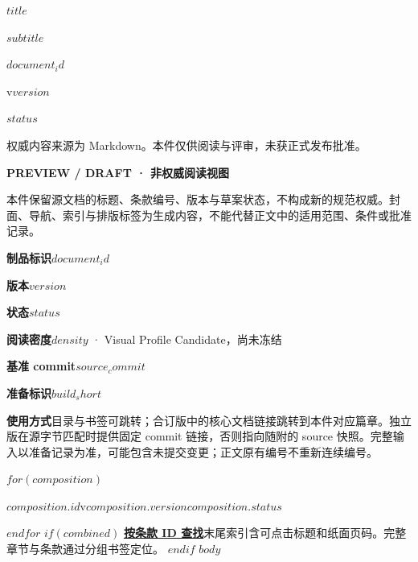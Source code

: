 \documentclass[UTF8,fontset=none,scheme=plain,11pt,a4paper,oneside,openany]{kbbook}
\begin{document}
\pagestyle{empty}
\pagecolor{PreviewNavy}\color{white}
\vspace*{30mm}
\begin{flushleft}{\sffamily\bfseries\fontsize{29}{38}\selectfont $title$\par}\end{flushleft}
\vspace{8mm}
{\sffamily\large $subtitle$\par}
\vfill
{\sffamily\small $document_id$\par\medskip v$version$\par\medskip $status$\par}
\vspace{10mm}
{\small 权威内容来源为 Markdown。本件仅供阅读与评审，未获正式发布批准。\par}
\clearpage\nopagecolor\color{PreviewInk}\pagestyle{fancy}
\noindent\textbf{PREVIEW / DRAFT · 非权威阅读视图}

本件保留源文档的标题、条款编号、版本与草案状态，不构成新的规范权威。封面、导航、索引与排版标签为生成内容，不能代替正文中的适用范围、条件或批准记录。

\medskip
\noindent\textbf{制品标识}\quad $document_id$\par
\noindent\textbf{版本}\quad $version$\par
\noindent\textbf{状态}\quad $status$\par
\noindent\textbf{阅读密度}\quad $density$ · Visual Profile Candidate，尚未冻结\par
\noindent\textbf{基准 commit}\quad\texttt{$source_commit$}\par
\noindent\textbf{准备标识}\quad\texttt{$build_short$}\par
\noindent\textbf{使用方式}\quad 目录与书签可跳转；合订版中的核心文档链接跳转到本件对应篇章。独立版在源字节匹配时提供固定 commit 链接，否则指向随附的 source 快照。完整输入以准备记录为准，可能包含未提交变更；正文原有编号不重新连续编号。

$for(composition)$
\par\noindent\hyperlink{$composition.anchor$}{\textbf{$composition.id$}}\quad v$composition.version$\quad $composition.status$\par
$endfor$
$if(combined)$
\medskip\noindent\hyperlink{generated-requirement-index}{\textbf{按条款 ID 查找}}\quad 末尾索引含可点击标题和纸面页码。完整章节与条款通过分组书签定位。
$endif$
\clearpage
\setcounter{tocdepth}{$toc_depth$}
\tableofcontents
\clearpage
$body$
\end{document}
